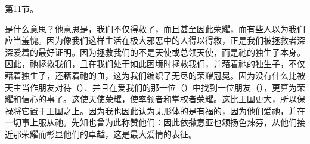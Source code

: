 第11节。\par

是什么意思？他意思是，我们不仅得救了，而且甚至因此荣耀，而有些人以为我们应当羞愧。因为像我们这样生活在极大邪恶中的人得以得救，正是我们被拯救者深深爱着的最好证明。因为拯救我们的不是天使或总领天使，而是祂的独生子本身。因此，祂拯救我们，且在我们处于如此困境时拯救我们，并藉着祂的独生子，不仅藉着独生子，还藉着祂的血，这为我们编织了无尽的荣耀冠冕。因为没有什么比被天主当作朋友对待（）、并且在爱我们的那一位（）中找到一位朋友（），更算为荣耀和信心的事了。这使天使荣耀，使率领者和掌权者荣耀。这比王国更大，所以保禄将它置于王国之上。因为我也因此认为无形体的是有福的，因为他们爱祂，并在一切事上服从祂。先知也曾为此称赞他们：因此依撒意亚也颂扬色辣芬，从他们接近那荣耀而彰显他们的卓越，这是最大爱情的表征。\par

